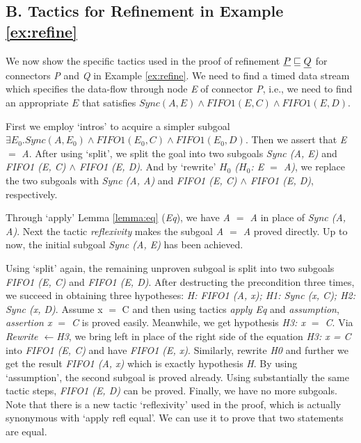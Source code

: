\documentclass{llncs}
\begin{document}
\subsection*{B. Tactics for Refinement in Example \ref{ex:refine}}
We now show the specific tactics used in the proof of refinement $\emph{P} \sqsubseteq \emph{Q}$ for connectors \emph{P} and \emph{Q} in
Example \ref{ex:refine}.
We need to find a timed data stream which specifies the data-flow through node \emph{E} of connector \emph{P}, i.e., we need to find an appropriate \emph{$E$} that satisfies $Sync(A,E)\wedge FIFO1(E,C) \wedge FIFO1(E,D)$.

First we employ `intros' to acquire a simpler subgoal $\exists E_{0}. Sync(A,E_{0})
\wedge FIFO1(E_{0},C) \wedge FIFO1(E_{0},D)$. Then we assert that \emph{E} $=$ \emph{A}.%
After using `split', we split the goal into two subgoals \emph{Sync (A, E)} and \emph{FIFO1 (E, C) $\wedge$ FIFO1 (E, D)}. And by `rewrite' \emph{$H_{0}$ ($H_{0}$: E $=$ A)}, we replace the two subgoals with \emph{Sync (A, A)} and \emph{FIFO1 (E, C) $\wedge$ FIFO1 (E, D)}, respectively.

Through `apply' Lemma \ref{lemma:eq} (\emph{Eq}), we have \emph{A $=$ A} in place of \emph{Sync (A, A)}. Next the tactic \emph{reflexivity} makes the subgoal \emph{A $=$ A} proved directly. Up to now, the initial subgoal \emph{Sync (A, E)} has been achieved.

Using `split' again, the remaining unproven subgoal is split into two subgoals \emph{FIFO1 (E, C)} and \emph {FIFO1 (E, D)}.
After destructing the precondition three times, we succeed in obtaining three hypotheses: \emph{ H: FIFO1 (A, x); H1: Sync (x, C); H2: Sync (x, D)}. Assume x $=$ C and then using tactics \emph{apply Eq} and \emph{assumption}, \emph{assertion x $=$ C} is proved easily. Meanwhile, we get hypothesis \emph{H3: x $=$ C}. Via \emph{Rewrite $\leftarrow$H3}, we bring left in place of the right side of the equation \emph{H3: x = C} into \emph{FIFO1 (E, C)} and have \emph{FIFO1 (E, x)}. Similarly, rewrite \emph{H0} and further we get the result \emph{FIFO1 (A, x)} which is exactly hypothesis \emph{H}. By using `assumption', the second subgoal is proved already.
Using substantially the same tactic steps, \emph{FIFO1 (E, D)} can be proved. Finally, we have no more subgoals. Note that there is a new tactic `reflexivity' used in the proof, which is actually synonymous with `apply refl equal'. We can use it to prove that two statements are equal.
\end{document}

